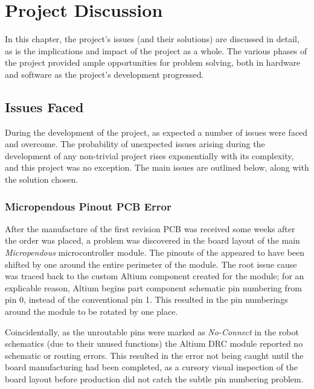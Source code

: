 \chapter{Project Discussion}
\label{chp:discussion}

In this chapter, the project's issues (and their solutions) are discussed in detail, as is the implications and impact of the project as a whole. The various phases of the project provided ample opportunities for problem solving, both in hardware and software as the project's development progressed.

\section{Issues Faced}

During the development of the project, as expected a number of issues were faced and overcome. The probability of unexpected issues arising during the development of any non-trivial project rises exponentially with its complexity, and this project was no exception. The main issues are outlined below, along with the solution chosen.

\subsection{Micropendous Pinout PCB Error}

After the manufacture of the first revision PCB was received some weeks after the order was placed, a problem was discovered in the board layout of the main \textit{Micropendous} microcontroller module. The pinouts of the appeared to have been shifted by one around the entire perimeter of the module. The root issue cause was traced back to the custom Altium component created for the module; for an explicable reason, Altium begins part component schematic pin numbering from pin 0, instead of the conventional pin 1. This resulted in the pin numberings around the module to be rotated by one place.


Coincidentally, as the unroutable pins were marked as \textit{No-Connect} in the robot schematics (due to their unused functions) the Altium DRC module reported no schematic or routing errors. This resulted in the error not being caught until the board manufacturing had been completed, as a cursory visual inspection of the board layout before production did not catch the subtle pin numbering problem.

